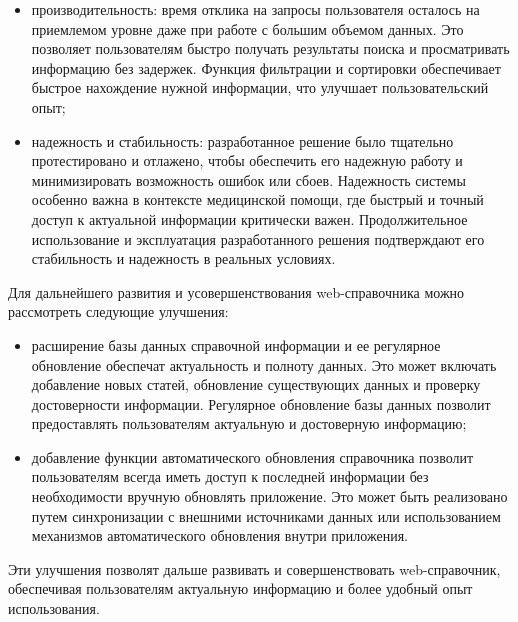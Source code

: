 \begin{itemize}
    \item производительность: время отклика на запросы пользователя осталось на приемлемом уровне даже при работе с большим объемом данных. Это позволяет пользователям быстро получать результаты поиска и просматривать информацию без задержек. Функция фильтрации и сортировки обеспечивает быстрое нахождение нужной информации, что улучшает пользовательский опыт;
    \item надежность и стабильность: разработанное решение было тщательно протестировано и отлажено, чтобы обеспечить его надежную работу и минимизировать возможность ошибок или сбоев. Надежность системы особенно важна в контексте медицинской помощи, где быстрый и точный доступ к актуальной информации критически важен. Продолжительное использование и эксплуатация разработанного решения подтверждают его стабильность и надежность в реальных условиях.
\end{itemize}

Для дальнейшего развития и усовершенствования web-справочника можно рассмотреть следующие улучшения:

\begin{itemize}
    \item расширение базы данных справочной информации и ее регулярное обновление обеспечат актуальность и полноту данных. Это может включать добавление новых статей, обновление существующих данных и проверку достоверности информации. Регулярное обновление базы данных позволит предоставлять пользователям актуальную и достоверную информацию;
    \item добавление функции автоматического обновления справочника позволит пользователям всегда иметь доступ к последней информации без необходимости вручную обновлять приложение. Это может быть реализовано путем синхронизации с внешними источниками данных или использованием механизмов автоматического обновления внутри приложения.
\end{itemize}

Эти улучшения позволят дальше развивать и совершенствовать web-справочник, обеспечивая пользователям актуальную информацию и более удобный опыт использования.